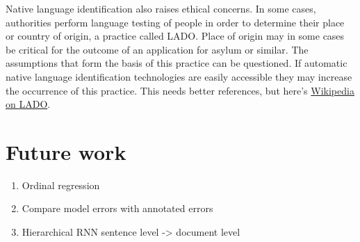 Native language identification also raises ethical concerns. In some cases,
authorities perform language testing of people in order to determine their
place or country of origin, a practice called \ac{LADO}. Place of origin may
in some cases be critical for the outcome of an application
for asylum or similar. The assumptions that form the basis of this practice
can be questioned. If automatic native language identification technologies
are easily accessible they may increase the occurrence of this practice. This
needs better references, but here's
\href{https://en.wikipedia.org/wiki/Language_analysis_for_the_determination_of_origin}{Wikipedia
on \ac{LADO}}.


\section{Future work}

\begin{enumerate}
    \item Ordinal regression
    \item Compare model errors with annotated errors
    \item Hierarchical RNN sentence level -> document level
\end{enumerate}
